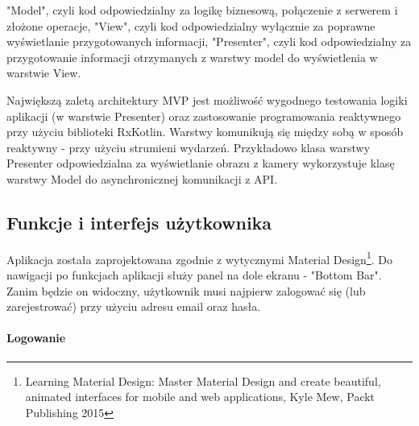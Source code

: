 \newline
\textbullet \space "Model", czyli kod odpowiedzialny za logikę biznesową, połączenie z serwerem i złożone operacje,\newline
\textbullet \space "View", czyli kod odpowiedzialny wyłącznie za poprawne wyświetlanie przygotowanych informacji,\newline
\textbullet \space "Presenter", czyli kod odpowiedzialny za przygotowanie informacji otrzymanych z warstwy model do wyświetlenia w warstwie View.\newline

\newline Największą zaletą architektury MVP jest możliwość wygodnego testowania logiki aplikacji (w warstwie Presenter) oraz zastosowanie programowania reaktywnego przy użyciu biblioteki RxKotlin.
Warstwy komunikują się między sobą w sposób reaktywny - przy użyciu strumieni wydarzeń. Przykładowo klasa warstwy Presenter odpowiedzialna za wyświetlanie obrazu z kamery wykorzystuje klasę warstwy Model do asynchronicznej komunikacji z API.

\subsection*{Funkcje i interfejs użytkownika}
Aplikacja została zaprojektowana zgodnie z wytycznymi Material Design\footnote{Learning Material Design: Master Material Design and create beautiful, animated interfaces for mobile and web applications, Kyle Mew, Packt Publishing 2015}.
Do nawigacji po funkcjach aplikacji służy panel na dole ekranu - "Bottom Bar".
Zanim będzie on widoczny, użytkownik musi najpierw zalogować się (lub zarejestrować) przy użyciu adresu email oraz hasła.

\paragraph{Logowanie}

